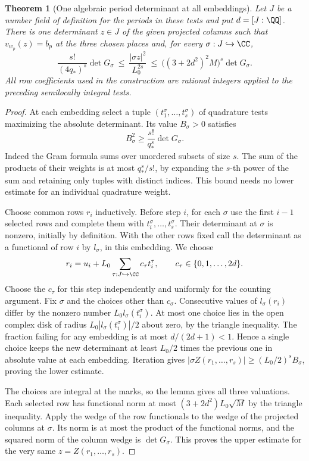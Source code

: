 \documentclass[a4paper,11pt]{article}
\newtheorem{theorem}[proposition]{Theorem}
\theoremstyle{definition}
\theoremstyle{remark}
\numberwithin{equation}{section}
\begin{document}
\begin{theorem}[One algebraic period determinant at all embeddings]\leavevmode
\label{thm:allplacesminor477}
Let \(J\) be a number field of definition for the periods in these
tests and put \(d=[J:\QQ]\). There is one determinant \(z\in J\)
of the given projected columns such that \(v_{w_p}(z)=b_p\) at
the three chosen places and, for every \(\sigma:J\hookrightarrow\CC\),
\[
 \frac{s!}{(4q_*)^s}\det G_\sigma
   \ \le\ \frac{|\sigma z|^2}{L_0^{2s}}
   \ \le\ \big((3+2d^2)^2 M\big)^s\det G_\sigma .
\]
All row coefficients used in the construction are rational
integers applied to the preceding semilocally integral tests.
\end{theorem}
\begin{proof}
At each embedding select a tuple
\((t_1^\sigma,\ldots,t_s^\sigma)\) of quadrature tests maximizing
the absolute determinant. Its value \(B_\sigma>0\) satisfies
\[
             B_\sigma^2\ge \frac{s!}{q_*^s}\det G_\sigma .
\]
Indeed the Gram formula sums over unordered subsets of size
\(s\). The sum of the products of their weights is at most
\(q_*^s/s!\), by expanding the \(s\)-th power of the sum and
retaining only tuples with distinct indices. This bound needs
no lower estimate for an individual quadrature weight.

Choose common rows \(r_i\) inductively. Before step \(i\),
for each \(\sigma\) use the first \(i-1\) selected rows and
complete them with \(t_i^\sigma,\ldots,t_s^\sigma\). Their
determinant at \(\sigma\) is nonzero, initially by definition.
With the other rows fixed call the determinant as a functional
of row \(i\) by \(l_\sigma\), in this embedding. We choose
\[
      r_i=u_i+L_0\sum_{\tau:J\hookrightarrow\CC}
                           c_\tau t_i^\tau,\qquad
                   c_\tau\in\{0,1,\ldots,2d\}.
\]
Choose the \(c_\tau\) for this step independently and uniformly
for the counting argument. Fix \(\sigma\) and the choices other
than \(c_\sigma\). Consecutive values of \(l_\sigma(r_i)\) differ
by the nonzero number \(L_0 l_\sigma(t_i^\sigma)\). At most one
choice lies in the open complex disk of radius
\(L_0|l_\sigma(t_i^\sigma)|/2\) about zero, by the triangle
inequality. The fraction failing for any embedding is at most
\(d/(2d+1)<1\). Hence a single choice keeps the new determinant
at least \(L_0/2\) times the previous one in absolute value at
each embedding. Iteration gives
\(|\sigma Z(r_1,\ldots,r_s)|\ge (L_0/2)^sB_\sigma\), proving
the lower estimate.

The choices are integral at the marks, so the lemma gives all
three valuations. Each selected row has functional norm at most
\((3+2d^2)L_0\sqrt M\) by the triangle inequality. Apply the
wedge of the row functionals to the wedge of the projected
columns at \(\sigma\). Its norm is at most the product of the
functional norms, and the squared norm of the column wedge is
\(\det G_\sigma\). This proves the upper estimate for the very
same \(z=Z(r_1,\ldots,r_s)\).
\end{proof}
\end{document}
